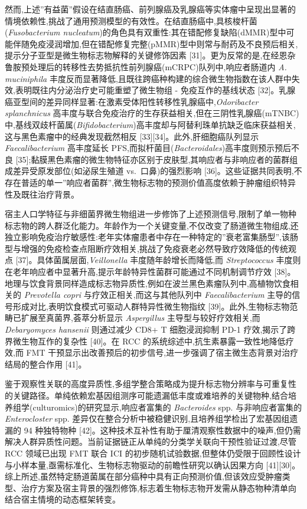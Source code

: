 然而,上述''有益菌''假设在结直肠癌、前列腺癌及乳腺癌等实体瘤中呈现出显著的情境依赖性,挑战了通用预测模型的有效性。在结直肠癌中,具核梭杆菌(\emph{Fusobacterium nucleatum})的角色具有双重性:其在错配修复缺陷(dMMR)型中可能伴随免疫浸润增加,但在错配修复完整(pMMR)型中则常与耐药及不良预后相关,提示分子亚型是微生物标志物解释的关键修饰因素 {[}31{]}。更为反常的是,在经恩杂鲁胺预处理后的转移性去势抵抗性前列腺癌(mCRPC)队列中,响应者肠道内 \emph{A. muciniphila} 丰度反而显著降低,且既往跨癌种构建的综合微生物指数在该人群中失效,表明既往内分泌治疗史可能重塑了微生物组 - 免疫互作的基线状态 {[}32{]}。乳腺癌亚型间的差异同样显著:在激素受体阳性转移性乳腺癌中,\emph{Odoribacter splanchnicus} 高丰度与联合免疫治疗的生存获益相关,但在三阴性乳腺癌(mTNBC)中,基线双歧杆菌属(\emph{Bifidobacterium})高丰度却与阿替利珠单抗缺乏临床获益相关,这与黑色素瘤中的经典发现截然相反 {[}33{]}{[}34{]}。此外,肝细胞癌队列显示 \emph{Faecalibacterium} 高丰度延长 PFS,而拟杆菌目(\emph{Bacteroidales})高丰度则预示预后不良 {[}35{]};黏膜黑色素瘤的微生物特征亦区别于皮肤型,其响应者与非响应者的菌群组成差异受原发部位(如泌尿生殖道 vs.~口鼻)的强烈影响 {[}36{]}。这些证据共同表明,不存在普适的单一''响应者菌群'',微生物标志物的预测价值高度依赖于肿瘤组织特异性及既往治疗背景。

宿主人口学特征与非细菌界微生物组进一步修饰了上述预测信号,限制了单一物种标志物的跨人群泛化能力。年龄作为一个关键变量,不仅改变了肠道微生物组成,还独立影响免疫治疗敏感性:老年实体瘤患者中存在一种特定的''衰老富集肠型'',该肠型与增强的免疫检查点阻断疗效相关,挑战了免疫衰老必然导致疗效降低的传统观点 {[}37{]}。具体菌属层面,\emph{Veillonella} 丰度随年龄增长而降低,而 \emph{Streptococcus} 丰度则在老年响应者中显著升高,提示年龄特异性菌群可能通过不同机制调节疗效 {[}38{]}。地理与饮食背景同样造成标志物异质性,例如在波兰黑色素瘤队列中,高植物饮食相关的 \emph{Prevotella copri} 与疗效正相关,而这与其他队列中 \emph{Faecalibacterium} 主导的信号形成对比,表明饮食模式可驱动人群特异性微生物指纹 {[}39{]}。此外,生物标志物范畴已扩展至真菌界,荟萃分析显示 \emph{Aspergillus} 主导型与较好疗效相关,而 \emph{Debaryomyces hansenii} 则通过减少 CD8+ T 细胞浸润抑制 PD-1 疗效,揭示了跨界微生物互作的复杂性 {[}40{]}。在 RCC 的系统综述中,抗生素暴露一致性地降低疗效,而 FMT 干预显示出改善预后的初步信号,进一步强调了宿主微生态背景对治疗结局的整合作用 {[}41{]}。

鉴于观察性关联的高度异质性,多组学整合策略成为提升标志物分辨率与可重复性的关键路径。单纯依赖宏基因组测序可能遗漏低丰度或难培养的关键物种,结合培养组学(culturomics)的研究显示,响应者富集的 \emph{Bacteroides} spp. 与非响应者富集的 \emph{Enterocloster} spp. 差异仅在整合分析中被稳健识别,且培养组学检出了宏基因组遗漏的 94 种独特物种 {[}42{]}。这种技术互补性有助于厘清观察性数据中的噪声,但仍需解决人群异质性问题。当前证据链正从单纯的分类学关联向干预性验证过渡,尽管 RCC 领域已出现 FMT 联合 ICI 的初步随机试验数据,但整体仍受限于回顾性设计与小样本量,亟需标准化、生物标志物驱动的前瞻性研究以确认因果方向 {[}41{]}{[}30{]}。综上所述,虽然特定肠道菌属在部分癌种中具有正向预测价值,但该效应受肿瘤类型、治疗方案及宿主背景的强烈修饰,标志着生物标志物开发需从静态物种清单向结合宿主情境的动态框架转变。

